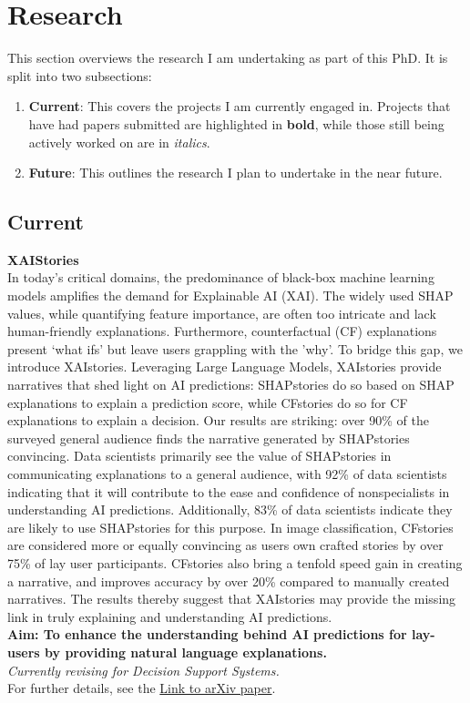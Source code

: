 \section{Research}

This section overviews the research I am undertaking as part of this PhD.
It is split into two subsections:
\begin{enumerate}
    \item \textbf{Current}: This covers the projects I am currently engaged in. Projects that have had papers 
    submitted are highlighted in \textbf{bold}, while those still being actively worked on are in \textit{italics}.
\item \textbf{Future}: This outlines the research I plan to undertake in the near future.
\end{enumerate}

\subsection*{Current}

\textbf{XAIStories}\\
In today's critical domains, the predominance of black-box machine learning models amplifies the demand for 
Explainable AI (XAI). The widely used SHAP values, while quantifying feature importance, are often too 
intricate and lack human-friendly explanations. Furthermore, counterfactual (CF) explanations present 
`what ifs' but leave users grappling with the 'why'. To bridge this gap, we introduce XAIstories. 
Leveraging Large Language Models, XAIstories provide narratives that shed light on AI predictions: 
SHAPstories do so based on SHAP explanations to explain a prediction score, while CFstories do so for CF 
explanations to explain a decision. Our results are striking: over 90\% of the surveyed general audience 
finds the narrative generated by SHAPstories convincing. Data scientists primarily see the value of SHAPstories 
in communicating explanations to a general audience, with 92\% of data scientists indicating that it will contribute 
to the ease and confidence of nonspecialists in understanding AI predictions. Additionally, 83\% of data 
scientists indicate they are likely to use SHAPstories for this purpose. In image classification, 
CFstories are considered more or equally convincing as users own crafted stories by over 75\% of lay 
user participants. CFstories also bring a tenfold speed gain in creating a narrative, and improves accuracy by 
over 20\% compared to manually created narratives. The results thereby suggest that XAIstories may provide the 
missing link in truly explaining and understanding AI predictions.\\
\textbf{Aim: To enhance the understanding behind AI predictions for lay-users by providing natural language
        explanations.}\\
\textit{Currently revising for Decision Support Systems.} \\
For further details, see the \href{https://arxiv.org/abs/2309.17057}{Link to arXiv paper}. \\

